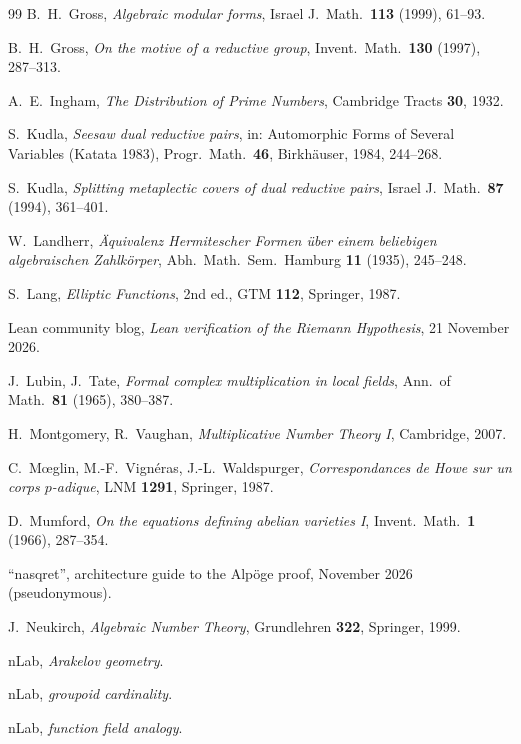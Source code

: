 \documentclass[11pt]{amsart}
\theoremstyle{definition}
\theoremstyle{remark}
\begin{document}
\begin{thebibliography}{99}
 B.~H.~Gross, \emph{Algebraic modular forms}, Israel J.\ Math.\ \textbf{113} (1999), 61--93.

 B.~H.~Gross, \emph{On the motive of a reductive group}, Invent.\ Math.\ \textbf{130} (1997), 287--313.

 A.~E.~Ingham, \emph{The Distribution of Prime Numbers}, Cambridge Tracts \textbf{30}, 1932.

 S.~Kudla, \emph{Seesaw dual reductive pairs}, in: Automorphic Forms of Several Variables (Katata 1983), Progr.\ Math.\ \textbf{46}, Birkh\"auser, 1984, 244--268.

 S.~Kudla, \emph{Splitting metaplectic covers of dual reductive pairs}, Israel J.\ Math.\ \textbf{87} (1994), 361--401.

 W.~Landherr, \emph{\"Aquivalenz Hermitescher Formen \"uber einem beliebigen algebraischen Zahlk\"orper}, Abh.\ Math.\ Sem.\ Hamburg \textbf{11} (1935), 245--248.

 S.~Lang, \emph{Elliptic Functions}, 2nd ed., GTM \textbf{112}, Springer, 1987.

 Lean community blog, \emph{Lean verification of the Riemann Hypothesis}, 21 November 2026.

 J.~Lubin, J.~Tate, \emph{Formal complex multiplication in local fields}, Ann.\ of Math.\ \textbf{81} (1965), 380--387.

 H.~Montgomery, R.~Vaughan, \emph{Multiplicative Number Theory I}, Cambridge, 2007.

 C.~M\oe glin, M.-F.~Vign\'eras, J.-L.~Waldspurger, \emph{Correspondances de Howe sur un corps $p$-adique}, LNM \textbf{1291}, Springer, 1987.

 D.~Mumford, \emph{On the equations defining abelian varieties I}, Invent.\ Math.\ \textbf{1} (1966), 287--354.

 ``nasqret'', architecture guide to the Alp\"oge proof, November 2026 (pseudonymous).

 J.~Neukirch, \emph{Algebraic Number Theory}, Grundlehren \textbf{322}, Springer, 1999.

 nLab, \emph{Arakelov geometry}.

 nLab, \emph{groupoid cardinality}.

 nLab, \emph{function field analogy}.


\end{thebibliography}
\end{document}
